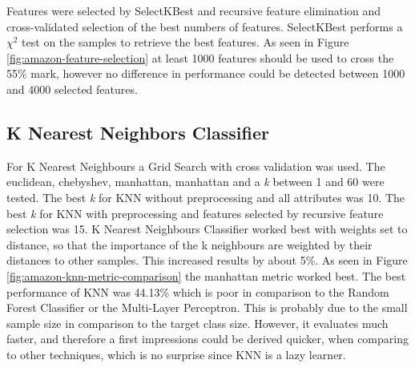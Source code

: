 Features were selected by SelectKBest and recursive feature elimination and cross-validated selection of the best numbers of features.
SelectKBest performs a ${\chi}^2$ test on the samples to retrieve the best features.
As seen in Figure \ref{fig:amazon-feature-selection} at least 1000 features should be used to cross the 55\% mark, however no difference in performance could be detected between 1000 and 4000 selected features.



\subsection{K Nearest Neighbors Classifier}

For K Nearest Neighbours a Grid Search with cross validation was used. The euclidean, chebyshev, manhattan, manhattan and a \textit{k} between 1 and 60 were tested. 
The best \textit{k} for KNN without preprocessing and all attributes was 10.
The best \textit{k} for KNN with preprocessing and features selected by recursive feature selection was 15.
K Nearest Neighbours Classifier worked best with weights set to distance, so that the importance of the k neighbours are weighted by their distances to other samples.
This increased results by about 5\%. As seen in Figure \ref{fig:amazon-knn-metric-comparison} the manhattan metric worked best.
The best performance of KNN was 44.13\% which is poor in comparison to the Random Forest Classifier or the Multi-Layer Perceptron.
This is probably due to the small sample size in comparison to the target class size.
However, it evaluates much faster, and therefore a first impressions could be derived quicker, when comparing to other techniques, which is no surprise since KNN is a lazy learner.


